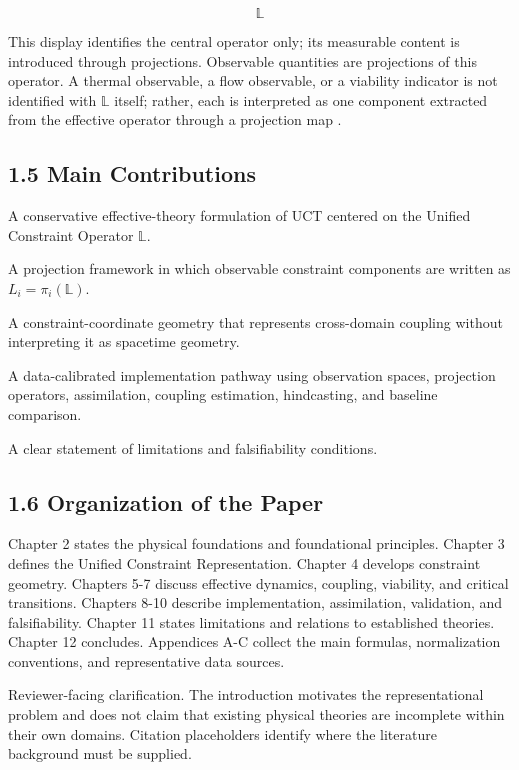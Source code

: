 \documentclass[aps,pre,reprint,superscriptaddress,nofootinbib]{revtex4-2}
\begin{document}
\[ \mathbb{L} \]

This display identifies the central operator only; its measurable content is introduced through projections. Observable quantities are projections of this operator. A thermal observable, a flow observable, or a viability indicator is not identified with \(\mathbb{L}\) itself; rather, each is interpreted as one component extracted from the effective operator through a projection map \cite{Kalman1960,Koopman1931,Schmid2010DMD,Berkooz1993POD}.

\subsection{1.5 Main Contributions}

A conservative effective-theory formulation \cite{Wilson1983RG,Goldenfeld1992} of UCT centered on the Unified Constraint Operator \(\mathbb{L}\).

A projection framework in which observable constraint components are written as \(L_i=\pi_i(\mathbb{L})\).

A constraint-coordinate geometry that represents cross-domain coupling without interpreting it as spacetime geometry.

A data-calibrated implementation pathway using observation spaces, projection operators, assimilation, coupling estimation, hindcasting, and baseline comparison.

A clear statement of limitations and falsifiability conditions.

\subsection{1.6 Organization of the Paper}

Chapter 2 states the physical foundations and foundational principles. Chapter 3 defines the Unified Constraint Representation. Chapter 4 develops constraint geometry. Chapters 5-7 discuss effective dynamics, coupling, viability, and critical transitions. Chapters 8-10 describe implementation, assimilation, validation, and falsifiability. Chapter 11 states limitations and relations to established theories. Chapter 12 concludes. Appendices A-C collect the main formulas, normalization conventions, and representative data sources.

Reviewer-facing clarification. The introduction motivates the representational problem and does not claim that existing physical theories are incomplete within their own domains. Citation placeholders identify where the literature background must be supplied.
\end{document}
